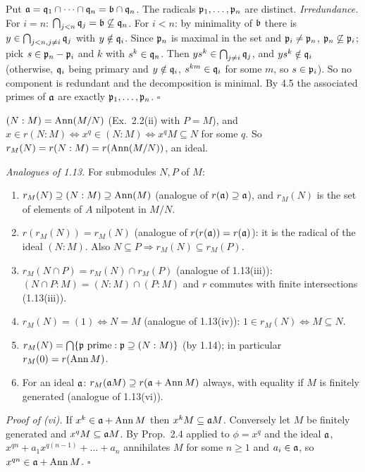 \documentclass[11pt]{article}
\begin{document}
Put $\mathfrak a=\mathfrak q_1\cap\dots\cap\mathfrak q_n=\mathfrak b\cap\mathfrak q_n$. The radicals $\mathfrak p_1,\dots,\mathfrak p_n$ are distinct. \emph{Irredundance.} For $i=n$: $\bigcap_{j<n}\mathfrak q_j=\mathfrak b\not\subseteq\mathfrak q_n$. For $i<n$: by minimality of $\mathfrak b$ there is $y\in\bigcap_{j<n,j\ne i}\mathfrak q_j$ with $y\notin\mathfrak q_i$. Since $\mathfrak p_n$ is maximal in the set and $\mathfrak p_i\ne\mathfrak p_n$, $\mathfrak p_n\not\subseteq\mathfrak p_i$; pick $s\in\mathfrak p_n-\mathfrak p_i$ and $k$ with $s^k\in\mathfrak q_n$. Then $ys^k\in\bigcap_{j\ne i}\mathfrak q_j$, and $ys^k\notin\mathfrak q_i$ (otherwise, $\mathfrak q_i$ being primary and $y\notin\mathfrak q_i$, $s^{km}\in\mathfrak q_i$ for some $m$, so $s\in\mathfrak p_i$). So no component is redundant and the decomposition is minimal. By 4.5 the associated primes of $\mathfrak a$ are exactly $\mathfrak p_1,\dots,\mathfrak p_n$. \hfill$\square$

\pf
$(N:M)=\operatorname{Ann}(M/N)$ (Ex.~2.2(ii) with $P=M$), and $x\in r(N:M)\iff x^q\in(N:M)\iff x^qM\subseteq N$ for some $q$. So $r_M(N)=r(N:M)=r(\operatorname{Ann}(M/N))$, an ideal.

\emph{Analogues of 1.13.} For submodules $N,P$ of $M$:
\begin{enumerate}[label=(\roman*),leftmargin=*]
\item $r_M(N)\supseteq(N:M)\supseteq\operatorname{Ann}(M)$ (analogue of $r(\mathfrak a)\supseteq\mathfrak a$), and $r_M(N)$ is the set of elements of $A$ nilpotent in $M/N$.
\item $r(r_M(N))=r_M(N)$ (analogue of $r(r(\mathfrak a))=r(\mathfrak a)$): it is the radical of the ideal $(N:M)$. Also $N\subseteq P\Rightarrow r_M(N)\subseteq r_M(P)$.
\item $r_M(N\cap P)=r_M(N)\cap r_M(P)$ (analogue of 1.13(iii)): $(N\cap P:M)=(N:M)\cap(P:M)$ and $r$ commutes with finite intersections (1.13(iii)).
\item $r_M(N)=(1)\iff N=M$ (analogue of 1.13(iv)): $1\in r_M(N)\iff M\subseteq N$.
\item $r_M(N)=\bigcap\{\mathfrak p\text{ prime}:\mathfrak p\supseteq(N:M)\}$ (by 1.14); in particular $r_M(0)=r(\operatorname{Ann} M)$.
\item For an ideal $\mathfrak a$: $r_M(\mathfrak a M)\supseteq r(\mathfrak a+\operatorname{Ann} M)$ always, with equality if $M$ is finitely generated (analogue of 1.13(vi)).
\end{enumerate}
\emph{Proof of (vi).} If $x^k\in\mathfrak a+\operatorname{Ann} M$ then $x^kM\subseteq\mathfrak a M$. Conversely let $M$ be finitely generated and $x^qM\subseteq\mathfrak a M$. By Prop.~2.4 applied to $\phi=x^q$ and the ideal $\mathfrak a$, $x^{qn}+a_1x^{q(n-1)}+\dots+a_n$ annihilates $M$ for some $n\ge1$ and $a_i\in\mathfrak a$, so $x^{qn}\in\mathfrak a+\operatorname{Ann} M$. \hfill$\square$
\end{document}
